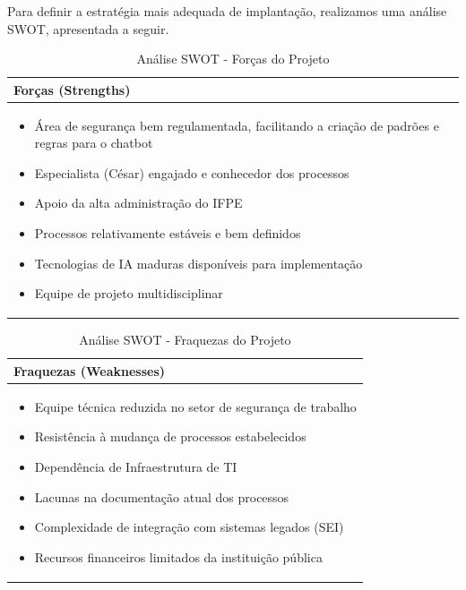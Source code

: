 \documentclass[12pt,a4paper]{article}
\begin{document}
Para definir a estratégia mais adequada de implantação, realizamos uma análise SWOT, apresentada a seguir.

\begin{table}[htbp]
\centering
\begin{tcolorbox}[enhanced, colback=green!5, colframe=green!40!black, arc=3mm, boxrule=0.5pt, width=0.85\textwidth]
\begin{tabular}{|p{12cm}|}
\hline
\rowcolor{green!10}\large \textbf{Forças (Strengths)} \\
\hline
\begin{itemize}\setlength{\itemsep}{1pt}
\item Área de segurança bem regulamentada, facilitando a criação de padrões e regras para o chatbot
\item Especialista (César) engajado e conhecedor dos processos
\item Apoio da alta administração do IFPE
\item Processos relativamente estáveis e bem definidos
\item Tecnologias de IA maduras disponíveis para implementação
\item Equipe de projeto multidisciplinar
\end{itemize} \\
\hline
\end{tabular}
\end{tcolorbox}
\caption{Análise SWOT - Forças do Projeto}
\end{table}

\begin{table}[htbp]
\centering
\begin{tcolorbox}[enhanced, colback=red!5, colframe=red!40!black, arc=3mm, boxrule=0.5pt, width=0.85\textwidth]
\begin{tabular}{|p{12cm}|}
\hline
\rowcolor{red!10}\large \textbf{Fraquezas (Weaknesses)} \\
\hline
\begin{itemize}\setlength{\itemsep}{1pt}
\item Equipe técnica reduzida no setor de segurança de trabalho
\item Resistência à mudança de processos estabelecidos
\item Dependência de Infraestrutura de TI
\item Lacunas na documentação atual dos processos
\item Complexidade de integração com sistemas legados (SEI)
\item Recursos financeiros limitados da instituição pública
\end{itemize} \\
\hline
\end{tabular}
\end{tcolorbox}
\caption{Análise SWOT - Fraquezas do Projeto}
\end{table}
\end{document}
